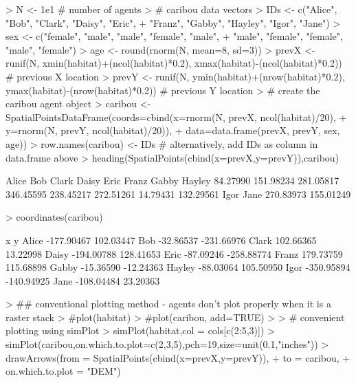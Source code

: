 \documentclass{article}
\begin{document}
\begin{Schunk}
\begin{Sinput}
> N <- 1e1 # number of agents
> # caribou data vectors
> IDs <- c("Alice", "Bob", "Clark", "Daisy", "Eric",
+          "Franz", "Gabby", "Hayley", "Igor", "Jane")
> sex <- c("female", "male", "male", "female", "male",
+          "male", "female", "female", "male", "female")
> age <- round(rnorm(N, mean=8, sd=3))
> prevX <- runif(N, xmin(habitat)+(ncol(habitat)*0.2), xmax(habitat)-(ncol(habitat)*0.2)) # previous X location
> prevY <- runif(N, ymin(habitat)+(nrow(habitat)*0.2), ymax(habitat)-(nrow(habitat)*0.2)) # previous Y location
> # create the caribou agent object
> caribou <- SpatialPointsDataFrame(coords=cbind(x=rnorm(N, prevX, ncol(habitat)/20),
+                                                y=rnorm(N, prevY, ncol(habitat)/20)),
+                                   data=data.frame(prevX, prevY, sex, age))
> row.names(caribou) <- IDs # alternatively, add IDs as column in data.frame above
> heading(SpatialPoints(cbind(x=prevX,y=prevY)),caribou)
\end{Sinput}
\begin{Soutput}
    Alice       Bob     Clark     Daisy      Eric     Franz     Gabby    Hayley 
 84.27990 151.98234 281.05817 346.45595 238.45217 272.51261  14.79431 132.29561 
     Igor      Jane 
270.83973 155.01249 
\end{Soutput}
\begin{Sinput}
> coordinates(caribou)
\end{Sinput}
\begin{Soutput}
                x          y
Alice  -177.90467  102.03447
Bob     -32.86537 -231.66976
Clark   102.66365   13.22998
Daisy  -194.00788  128.41653
Eric    -87.09246 -258.88774
Franz   179.73759  115.68898
Gabby   -15.36590  -12.24363
Hayley  -88.03064  105.50950
Igor   -350.95894 -140.94925
Jane   -108.04484   23.20363
\end{Soutput}
\begin{Sinput}
> ## conventional plotting method - agents don't plot properly when it is a raster stack
> #plot(habitat)
> #plot(caribou, add=TRUE)
> 
> # convenient plotting using simPlot
> simPlot(habitat,col = cols[c(2:5,3)])
> simPlot(caribou,on.which.to.plot=c(2,3,5),pch=19,size=unit(0.1,"inches"))
> drawArrows(from = SpatialPoints(cbind(x=prevX,y=prevY)),
+            to = caribou,
+            on.which.to.plot = "DEM")
\end{Sinput}
\end{Schunk}
\end{document}
